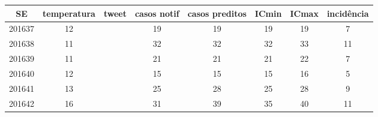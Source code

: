 \begin{tabular}{c|ccccccc}
  \hline
SE & temperatura & tweet & casos notif & casos preditos & ICmin & ICmax & incidência \\ 
  \hline
201637 & 12 &  & 19 & 19 & 19 & 19 & 7 \\ 
  201638 & 11 &  & 32 & 32 & 32 & 33 & 11 \\ 
  201639 & 11 &  & 21 & 21 & 21 & 22 & 7 \\ 
  201640 & 12 &  & 15 & 15 & 15 & 16 & 5 \\ 
  201641 & 13 &  & 25 & 28 & 25 & 28 & 9 \\ 
  201642 & 16 &  & 31 & 39 & 35 & 40 & 11 \\ 
   \hline
\end{tabular}
